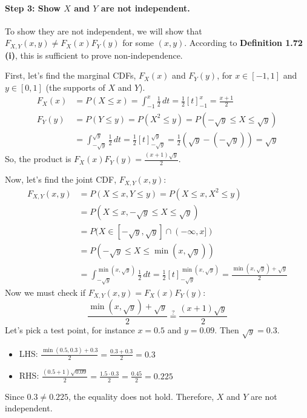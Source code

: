 \documentclass[11pt,a4paper]{article}
\begin{document}
\paragraph{Step 3: Show $X$ and $Y$ are not independent.}
To show they are not independent, we will show that $F_{X,Y}(x,y) \neq F_X(x)F_Y(y)$ for some $(x,y)$. According to \textbf{Definition 1.72 (i)}, this is sufficient to prove non-independence.

First, let's find the marginal CDFs, $F_X(x)$ and $F_Y(y)$, for $x \in [-1,1]$ and $y \in [0,1]$ (the supports of $X$ and $Y$).
\begin{align*}
    F_X(x) &= P(X \le x) = \int_{-1}^{x} \frac{1}{2} \,dt = \frac{1}{2}[t]_{-1}^x = \frac{x+1}{2} \\
    F_Y(y) &= P(Y \le y) = P(X^2 \le y) = P(-\sqrt{y} \le X \le \sqrt{y}) \\
           &= \int_{-\sqrt{y}}^{\sqrt{y}} \frac{1}{2} \,dt = \frac{1}{2}[t]_{-\sqrt{y}}^{\sqrt{y}} = \frac{1}{2}(\sqrt{y} - (-\sqrt{y})) = \sqrt{y}
\end{align*}
So, the product is $F_X(x)F_Y(y) = \frac{(x+1)\sqrt{y}}{2}$.

Now, let's find the joint CDF, $F_{X,Y}(x,y)$:
\begin{align*}
    F_{X,Y}(x,y) &= P(X \le x, Y \le y) = P(X \le x, X^2 \le y) \\
                  &= P(X \le x, -\sqrt{y} \le X \le \sqrt{y}) \\
                  &= P(X \in [-\sqrt{y}, \sqrt{y}] \cap (-\infty, x]) \\
                  &= P(-\sqrt{y} \le X \le \min(x, \sqrt{y})) \\
                  &= \int_{-\sqrt{y}}^{\min(x, \sqrt{y})} \frac{1}{2} \,dt = \frac{1}{2}[t]_{-\sqrt{y}}^{\min(x, \sqrt{y})} = \frac{\min(x, \sqrt{y}) + \sqrt{y}}{2}
\end{align*}
Now we must check if $F_{X,Y}(x,y) = F_X(x)F_Y(y)$:
\begin{equation*}
    \frac{\min(x, \sqrt{y}) + \sqrt{y}}{2} \stackrel{?}{=} \frac{(x+1)\sqrt{y}}{2}
\end{equation*}
Let's pick a test point, for instance $x=0.5$ and $y=0.09$. Then $\sqrt{y}=0.3$.
\begin{itemize}
    \item LHS: $\frac{\min(0.5, 0.3) + 0.3}{2} = \frac{0.3 + 0.3}{2} = 0.3$
    \item RHS: $\frac{(0.5+1)\sqrt{0.09}}{2} = \frac{1.5 \cdot 0.3}{2} = \frac{0.45}{2} = 0.225$
\end{itemize}
Since $0.3 \neq 0.225$, the equality does not hold. Therefore, $X$ and $Y$ are not independent.
\end{document}
